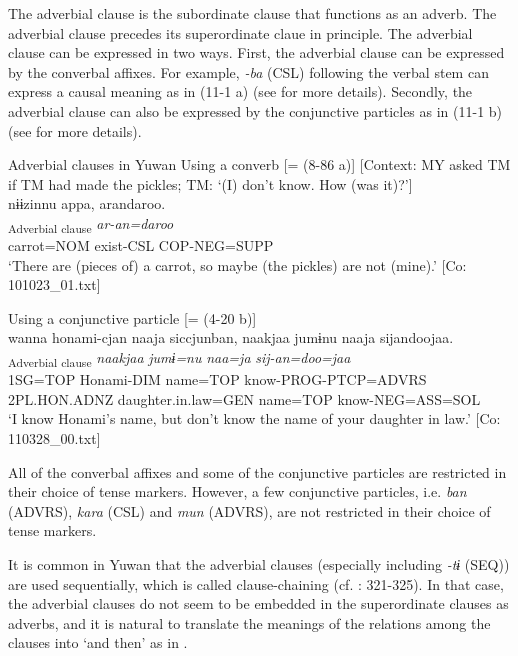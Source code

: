 The adverbial clause is the subordinate clause that functions as an adverb. The adverbial clause precedes its superordinate claue in principle. The adverbial clause can be expressed in two ways. First, the adverbial clause can be expressed by the converbal affixes. For example, \textit{{}-ba} (CSL) following the verbal stem can express a causal meaning as in (11-1 a) (see  for more details). Secondly, the adverbial clause can also be expressed by the conjunctive particles as in (11-1 b) (see  for more details).

\ea\label{ex:11-1}  Adverbial clauses in Yuwan
  \ea Using a converb [= (8-86 a)] [Context: MY asked TM if TM had made the pickles; TM: ‘(I) don’t know. How (was it)?’]\\
  \glll nɨɨzinnu  appa,  arandaroo.\\
    [\textit{nɨɨzin=nu}  \textit{ar-\Highlight{ba}}]\textsubscript{Adverbial clause}  \textit{ar-an=daroo}\\
    carrot=NOM  exist-CSL  COP-NEG=SUPP\\
    \glt ‘There are (pieces of) a carrot, so maybe (the pickles) are not (mine).’ [Co: 101023\_01.txt]

  \ex Using a conjunctive particle [= (4-20 b)]\\
   \glll wanna  honami-{\textbar}cjan{\textbar}  naaja  siccjunban, naakjaa  jumɨnu  naaja  sijandoojaa.\\
    [\textit{wan=ja}  \textit{honami-cjan}  \textit{naa=ja}  \textit{sij-tur-n=\Highlight{ban}}]\textsubscript{Adverbial clause} \textit{naakjaa}  \textit{jumɨ=nu}  \textit{naa=ja}  \textit{sij-an=doo=jaa}\\
    1SG=TOP  Honami-DIM  name=TOP  know-PROG-PTCP=ADVRS 2PL.HON.ADNZ  daughter.in.law=GEN  name=TOP  know-NEG=ASS=SOL\\
    \glt ‘I know Honami’s name, but don’t know the name of your daughter in law.’ [Co: 110328\_00.txt]
\z
\z

All of the converbal affixes and some of the conjunctive particles are restricted in their choice of tense markers. However, a few conjunctive particles, i.e. \textit{ban} (ADVRS), \textit{kara} (CSL) and \textit{mun} (ADVRS), are not restricted in their choice of tense markers.

It is common in Yuwan that the adverbial clauses (especially including \textit{{}-tɨ} (SEQ)) are used sequentially, which is called clause-chaining (cf. \citealt{Payne1997}: 321-325). In that case, the adverbial clauses do not seem to be embedded in the superordinate clauses as adverbs, and it is natural to translate the meanings of the relations among the clauses into ‘and then’ as in .

